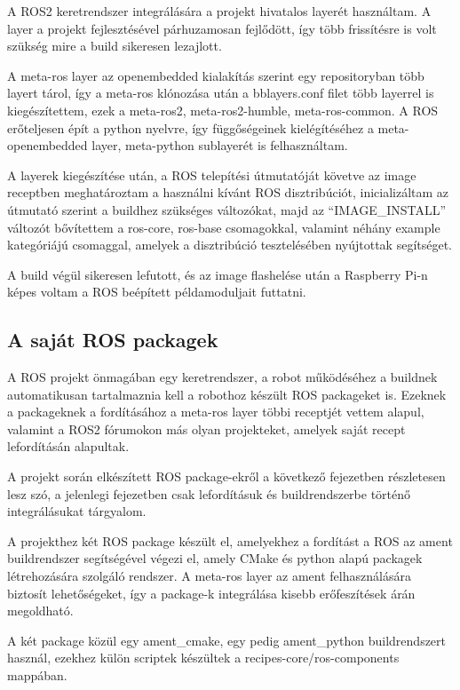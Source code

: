 A ROS2 keretrendszer integrálására a projekt hivatalos layerét használtam. A
layer a projekt fejlesztésével párhuzamosan fejlődött, így több frissítésre is
volt szükség mire a build sikeresen lezajlott.

A meta-ros layer az openembedded kialakítás szerint egy repositoryban több layert
tárol, így a meta-ros klónozása után a bblayers.conf filet több layerrel is
kiegészítettem, ezek a meta-ros2, meta-ros2-humble, meta-ros-common. A ROS
erőteljesen épít a python nyelvre, így függőségeinek kielégítéséhez a
meta-openembedded layer, meta-python sublayerét is felhasználtam.

A layerek kiegészítése után, a ROS telepítési útmutatóját követve az image
receptben meghatároztam a használni kívánt ROS disztribúciót, inicializáltam az
útmutató szerint a buildhez szükséges változókat, majd az ``IMAGE\_INSTALL''
változót bővítettem a ros-core, ros-base csomagokkal, valamint néhány example
kategóriájú csomaggal, amelyek a disztribúció tesztelésében nyújtottak
segítséget.

A build végül sikeresen lefutott, és az image flashelése után a Raspberry Pi-n
képes voltam a ROS beépített példamoduljait futtatni. 

\subsection{A saját ROS packagek}

A ROS projekt önmagában egy keretrendszer, a robot működéséhez a buildnek
automatikusan tartalmaznia kell a robothoz készült ROS packageket is. Ezeknek a
packageknek a fordításához a meta-ros layer többi receptjét vettem alapul,
valamint a ROS2 fórumokon más olyan projekteket, amelyek saját recept
lefordításán alapultak.

A projekt során elkészített ROS package-ekről a következő fejezetben részletesen
lesz szó, a jelenlegi fejezetben csak lefordításuk és buildrendszerbe történő
integrálásukat tárgyalom.

A projekthez két ROS package készült el, amelyekhez a fordítást a ROS az ament
buildrendszer segítségével végezi el, amely CMake és python alapú packagek
létrehozására szolgáló rendszer. A meta-ros layer az ament felhasználására
biztosít lehetőségeket, így a package-k integrálása kisebb erőfeszítések árán
megoldható. 

A két package közül egy ament\_cmake, egy pedig ament\_python buildrendszert
használ, ezekhez külön scriptek készültek a recipes-core/ros-components mappában.

